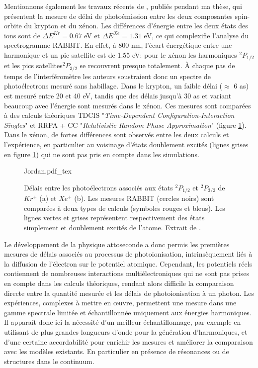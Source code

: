 Mentionnons également les travaux récents de , publiés pendant ma thèse, qui présentent la mesure de délai de photoémission entre les deux composantes spin-orbite du krypton et du xénon. Les différences d'énergie entre les deux états des ions sont de $\Delta E^{Kr} = 0.67$ eV et $\Delta E^{Xe} = 1.31$ eV, ce qui complexifie l'analyse du spectrogramme RABBIT. En effet, à 800 nm, l'écart énergétique entre une harmonique et un pic satellite est de 1.55 eV: pour le xénon les harmoniques $^2P_{1/2}$ et les pics satellites$^2P_{3/2}$ se recouvrent presque totalement. \`A chaque pas de temps de l'interféromètre les auteurs soustraient donc un spectre de photoélectrons mesuré sans habillage. Dans le krypton, un faible délai ($\approx$ 6 as) est mesuré entre 20 et 40 eV, tandis que des délais jusqu'à 30 as et variant beaucoup avec l'énergie sont mesurés dans le xénon. Ces mesures sont comparées à des calculs théoriques TDCIS "\textit{Time-Dependent Configuration-Interaction Singles}" et RRPA + CC "\textit{Relativistic Random Phase Approximation}" (figure \ref{fig:Jordan}). Dans le xénon, de fortes différences sont observés entre les deux calculs et l'expérience, en particulier au voisinage d'états doublement excités (lignes grises en figure \ref{fig:Jordan}) qui ne sont pas pris en compte dans les simulations.
\begin{figure}
\centering
\def\svgwidth{0.6\textwidth}
{Jordan.pdf_tex}
\caption{Délais entre les photoélectrons associés aux états $^2P_{1/2}$ et $^2P_{3/2}$ de $Kr^+$ (a) et $Xe^+$ (b). Les mesures RABBIT (cercles noirs) sont comparées à deux types de calculs (symboles rouges et bleus). Les lignes vertes et grises représentent respectivement des états simplement et doublement excités de l'atome. Extrait de .}
\label{fig:Jordan}
\end{figure}

Le développement de la physique attoseconde a donc permis les premières mesures de délais associés au processus de photoionisation, intrinsèquement liés à la diffusion de l'électron sur le potentiel atomique. Cependant, les potentiels réels contiennent de nombreuses interactions multiélectroniques qui ne sont pas prises en compte dans les calculs théoriques, rendant alors difficile la comparaison directe entre la quantité mesurée et les délais de photoionisation à un photon. Les expériences, complexes à mettre en \oe{uvre}, permettent une mesure dans une gamme spectrale limitée et échantillonnée uniquement aux énergies harmoniques. Il apparaît donc ici la nécessité d'un meilleur échantillonnage, par exemple en utilisant de plus grandes longueurs d'onde pour la génération d'harmoniques, et d'une certaine accordabilité pour enrichir les mesures et améliorer la comparaison avec les modèles existants. En particulier en présence de résonances ou de structures dans le continuum.

